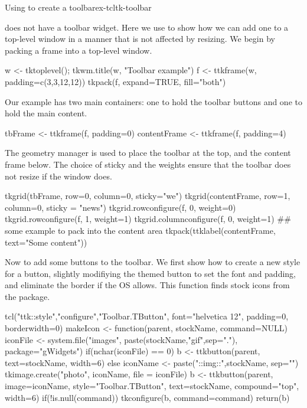 \begin{example}{Using  to create a toolbar}{ex-tcltk-toolbar}




\TK\/ does not have a toolbar widget. Here we use  to
show how we can add one to a top-level window in a manner that is not
affected by resizing. We begin by packing a frame into a
top-level window.
\begin{Schunk}
\begin{Sinput}
 w <- tktoplevel(); tkwm.title(w, "Toolbar example")
 f <- ttkframe(w, padding=c(3,3,12,12))
 tkpack(f, expand=TRUE, fill="both")
\end{Sinput}
\end{Schunk}
Our example has two main containers: one to hold the toolbar buttons
and one to hold the main content.
\begin{Schunk}
\begin{Sinput}
 tbFrame <- ttkframe(f, padding=0)
 contentFrame <- ttkframe(f, padding=4)
\end{Sinput}
\end{Schunk}
The  geometry manager is used to place the toolbar at
the top, and the content frame below. The choice of sticky and the weights ensure that
the toolbar does not resize if the window does.
\begin{Schunk}
\begin{Sinput}
 tkgrid(tbFrame, row=0, column=0, sticky="we")
 tkgrid(contentFrame, row=1, column=0, sticky = "news")
 tkgrid.rowconfigure(f, 0, weight=0)
 tkgrid.rowconfigure(f, 1, weight=1)
 tkgrid.columnconfigure(f, 0, weight=1)
 ## some example to pack into the content area
 tkpack(ttklabel(contentFrame, text="Some content"))
\end{Sinput}
\end{Schunk}

Now to add some buttons to the toolbar. We first show how to create a
new style for a button, slightly modifiying the themed button to set
the font and padding, and eliminate the border if the OS allows. This
 function finds stock icons from the 
package.
\begin{Schunk}
\begin{Sinput}
 tcl("ttk::style","configure","Toolbar.TButton", 
     font="helvetica 12", padding=0, borderwidth=0)
 makeIcon <- function(parent, stockName, command=NULL) {
   iconFile <- system.file("images", 
                           paste(stockName,"gif",sep="."), 
                           package="gWidgets")
   if(nchar(iconFile) == 0) {
     b <- ttkbutton(parent, text=stockName, width=6)
   } else {
     iconName <- paste("::img::",stockName, sep="")
     tkimage.create("photo", iconName, file = iconFile)
     b <- ttkbutton(parent, image=iconName, 
                    style="Toolbar.TButton", text=stockName, 
                    compound="top", width=6)
     if(!is.null(command))
       tkconfigure(b, command=command)
   }
   return(b)
 }
\end{Sinput}
\end{Schunk}


\end{example}

